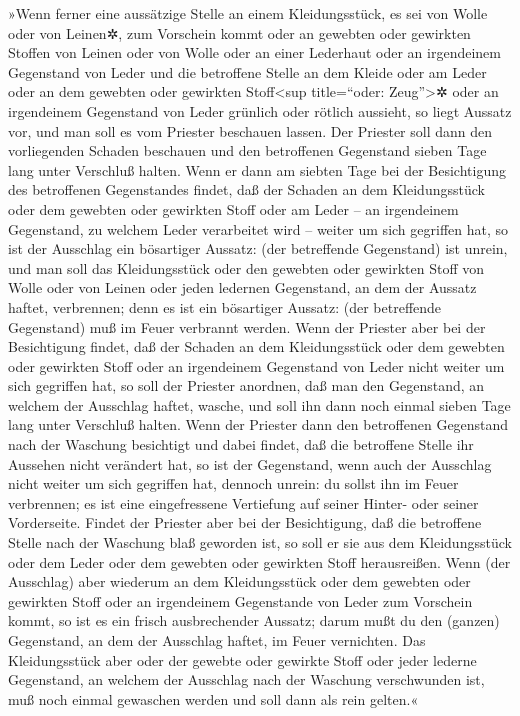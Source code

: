 »Wenn ferner eine aussätzige Stelle an einem
Kleidungsstück, es sei von Wolle oder von Leinen✲, zum Vorschein kommt
oder an gewebten oder gewirkten Stoffen von Leinen oder
von Wolle oder an einer Lederhaut oder an irgendeinem Gegenstand von
Leder und die betroffene Stelle an dem Kleide oder am
Leder oder an dem gewebten oder gewirkten Stoff\textless sup
title=``oder: Zeug''\textgreater✲ oder an irgendeinem Gegenstand von
Leder grünlich oder rötlich aussieht, so liegt Aussatz vor, und man soll
es vom Priester beschauen lassen. Der Priester soll dann
den vorliegenden Schaden beschauen und den betroffenen Gegenstand sieben
Tage lang unter Verschluß halten. Wenn er dann am siebten
Tage bei der Besichtigung des betroffenen Gegenstandes findet, daß der
Schaden an dem Kleidungsstück oder dem gewebten oder gewirkten Stoff
oder am Leder -- an irgendeinem Gegenstand, zu welchem Leder verarbeitet
wird -- weiter um sich gegriffen hat, so ist der Ausschlag ein
bösartiger Aussatz: (der betreffende Gegenstand) ist unrein,
und man soll das Kleidungsstück oder den gewebten oder
gewirkten Stoff von Wolle oder von Leinen oder jeden ledernen
Gegenstand, an dem der Aussatz haftet, verbrennen; denn es ist ein
bösartiger Aussatz: (der betreffende Gegenstand) muß im Feuer verbrannt
werden. Wenn der Priester aber bei der Besichtigung
findet, daß der Schaden an dem Kleidungsstück oder dem gewebten oder
gewirkten Stoff oder an irgendeinem Gegenstand von Leder nicht weiter um
sich gegriffen hat, so soll der Priester anordnen, daß
man den Gegenstand, an welchem der Ausschlag haftet, wasche, und soll
ihn dann noch einmal sieben Tage lang unter Verschluß halten.
Wenn der Priester dann den betroffenen Gegenstand nach
der Waschung besichtigt und dabei findet, daß die betroffene Stelle ihr
Aussehen nicht verändert hat, so ist der Gegenstand, wenn auch der
Ausschlag nicht weiter um sich gegriffen hat, dennoch unrein: du sollst
ihn im Feuer verbrennen; es ist eine eingefressene Vertiefung auf seiner
Hinter- oder seiner Vorderseite. Findet der Priester aber
bei der Besichtigung, daß die betroffene Stelle nach der Waschung blaß
geworden ist, so soll er sie aus dem Kleidungsstück oder dem Leder oder
dem gewebten oder gewirkten Stoff herausreißen. Wenn (der
Ausschlag) aber wiederum an dem Kleidungsstück oder dem gewebten oder
gewirkten Stoff oder an irgendeinem Gegenstande von Leder zum Vorschein
kommt, so ist es ein frisch ausbrechender Aussatz; darum mußt du den
(ganzen) Gegenstand, an dem der Ausschlag haftet, im Feuer vernichten.
Das Kleidungsstück aber oder der gewebte oder gewirkte
Stoff oder jeder lederne Gegenstand, an welchem der Ausschlag nach der
Waschung verschwunden ist, muß noch einmal gewaschen werden und soll
dann als rein gelten.«

